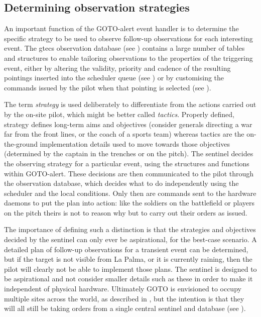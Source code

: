 \begin{colsection}
\newpage
\subsection{Determining observation strategies}
\label{sec:event_strategy}
\begin{colsection}

An important function of the GOTO-alert event handler is to determine the specific strategy to be used to observe follow-up observations for each interesting event. The \gls{gtecs} observation database (see ) contains a large number of tables and structures to enable tailoring observations to the properties of the triggering event, either by altering the validity, priority and cadence of the resulting pointings inserted into the scheduler queue (see ) or by customising the commands issued by the pilot when that pointing is selected (see ).

The term \textit{strategy} is used deliberately to differentiate from the actions carried out by the on-site pilot, which might be better called \textit{tactics}. Properly defined, strategy defines long-term aims and objectives (consider generals directing a war far from the front lines, or the coach of a sports team) whereas tactics are the on-the-ground implementation details used to move towards those objectives (determined by the captain in the trenches or on the pitch). The sentinel decides the observing strategy for a particular event, using the structures and functions within GOTO-alert. These decisions are then communicated to the pilot through the observation database, which decides what to do independently using the scheduler and the local conditions. Only then are commands sent to the hardware daemons to put the plan into action: like the soldiers on the battlefield or players on the pitch theirs is not to reason why but to carry out their orders as issued.

The importance of defining such a distinction is that the strategies and objectives decided by the sentinel can only ever be aspirational, for the best-case scenario. A detailed plan of follow-up observations for a transient event can be determined, but if the target is not visible from La Palma, or it is currently raining, then the pilot will clearly not be able to implement those plans. The sentinel is designed to be aspirational and not consider smaller details such as these in order to make it independent of physical hardware. Ultimately GOTO is envisioned to occupy multiple sites across the world, as described in , but the intention is that they will all still be taking orders from a single central sentinel and database (see ).


\end{colsection}
\end{colsection}
